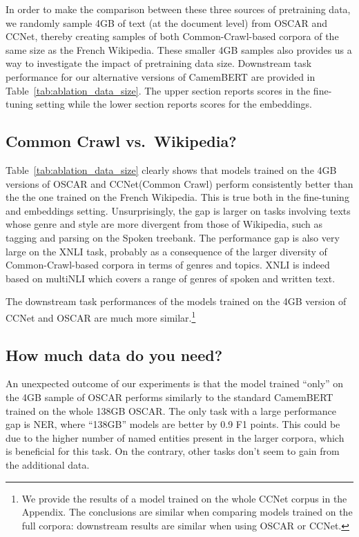 \documentclass[11pt,a4paper]{article}
\newcommand{\camembert}{CamemBERT\xspace}
\newcommand{\ccnet}{CCNet\xspace}
\newcommand{\oscar}{OSCAR\xspace}
\begin{document}
In order to make the comparison between these three sources of pretraining data, we randomly sample 4GB of text (at the document level) from \oscar and \ccnet, thereby creating samples of both Common-Crawl-based corpora of the same size as the French Wikipedia. These smaller 4GB samples also provides us a way to investigate the impact of pretraining data size. Downstream task performance for our alternative versions of \camembert are provided in Table~\ref{tab:ablation_data_size}.
The upper section reports scores in the fine-tuning setting while the lower section reports scores for the embeddings.

\subsection{Common Crawl vs.~Wikipedia?}
\label{subsec:homogeneityimpact}

Table~\ref{tab:ablation_data_size} clearly shows that models trained on the 4GB versions of \oscar and \ccnet (Common Crawl) perform consistently better than the the one trained on the French Wikipedia. This is true both in the fine-tuning and embeddings setting. Unsurprisingly, the gap is larger on tasks involving texts whose genre and style are more divergent from those of Wikipedia, such as tagging and parsing on the Spoken treebank.
The performance gap is also very large on the XNLI task, probably as a consequence of the larger diversity of Common-Crawl-based corpora in terms of genres and topics. XNLI is indeed based on multiNLI which covers a range of genres of spoken and written text.

The downstream task performances of the models trained on the 4GB version of \ccnet and \oscar are much more similar.\footnote{We provide the results of a model trained on the whole \ccnet corpus in the Appendix. The conclusions are similar when comparing models trained on the full corpora: downstream results are similar when using \oscar or \ccnet.}


\subsection{How much data do you need?}
\label{subsec:sizeimpact}

An unexpected outcome of our experiments is that the model trained ``only'' on the 4GB sample of \oscar performs similarly  to the standard \camembert trained on the whole 138GB \oscar.
The only task with a large performance gap is NER, where  ``138GB'' models are better by 0.9 F1 points. This could be due to the higher number of named entities present in the larger corpora, which is beneficial for this task. On the contrary, other tasks don't seem to gain from the additional data.
\end{document}
